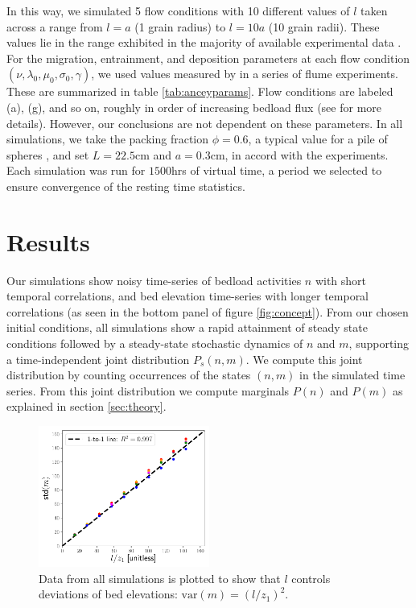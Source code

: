 \documentclass[draft]{agujournal2018}
\begin{document}
In this way, we simulated 5 flow conditions with 10 different values of $l$ taken across a range from $l=a$ (1 grain radius) to $l=10a$ (10 grain radii).
These values lie in the range exhibited in the majority of available experimental data \citep{Wong2007,Singh2009,Martin2014}.
For the migration, entrainment, and deposition parameters at each flow condition $(\nu, \lambda_0, \mu_0, \sigma_0, \gamma)$, we used values measured by \citet{Ancey2008} in a series of flume experiments.
These are summarized in table \ref{tab:anceyparams}.
Flow conditions are labeled (a), (g), and so on, roughly in order of increasing bedload flux (see \citet{Ancey2008} for more details). 
However, our conclusions are not dependent on these parameters.
In all simulations, we take the packing fraction $\phi = 0.6$, a typical value for a pile of spheres \citep[e.g.][]{Bennett1972}, and set $L = 22.5$cm and $a = 0.3$cm, in accord with the \citet{Ancey2008} experiments.
Each simulation was run for $1500$hrs of virtual time, a period we selected to ensure convergence of the resting time statistics.

\section{Results}

Our simulations show noisy time-series of bedload activities $n$ with short temporal correlations, and bed elevation time-series with longer temporal correlations (as seen in the bottom panel of figure \ref{fig:concept}).
From our chosen initial conditions, all simulations show a rapid attainment of steady state conditions followed by a steady-state stochastic dynamics of $n$ and $m$, supporting a time-independent joint distribution $P_s(n,m)$. We compute this joint distribution by counting occurrences of the states $(n,m)$ in the simulated time series.
From this joint distribution we compute marginals $P(n)$ and $P(m)$ as explained in section \ref{sec:theory}.

\begin{figure}
	\centering
	\includegraphics[width=0.5\textwidth,keepaspectratio]{./figures/variance.pdf}
	\caption{Data from all simulations is plotted to show that $l$ controls deviations of bed elevations: $\text{var}(m) = (l/z_1)^2$. }
	\label{fig:var}
\end{figure}
\end{document}
